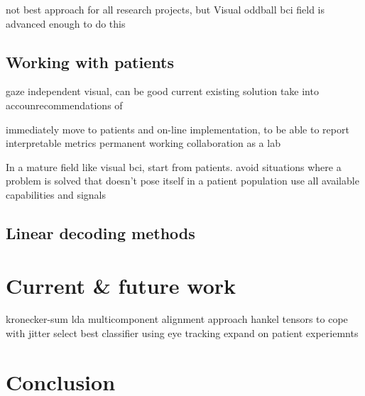 not best approach for all research projects, but
Visual oddball bci field is advanced enough to do this


\subsection{Working with patients}
gaze independent visual, can be good current existing solution
take into accounrecommendations of \textcite{FriedOken2020}

immediately move to patients and on-line implementation, to be able to report
interpretable metrics
permanent working collaboration as a lab

In a mature field like visual bci, start from patients.
avoid situations where a problem is solved that doesn't pose itself in a
patient population
use all available capabilities and signals


\subsection{Linear decoding methods}


\section{Current \& future work}
kronecker-sum lda
multicomponent alignment approach
hankel tensors to cope with jitter
select best classifier using eye tracking
expand on patient experiemnts

\section{Conclusion}
